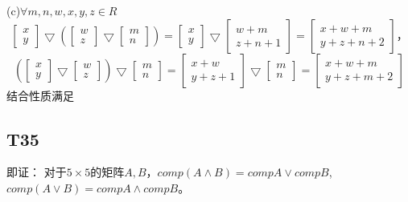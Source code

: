 \documentclass{article}
\begin{document}
(c)$\forall m, n, w, x, y, z \in R$
\[
\begin{bmatrix}
    x\\
    y
\end{bmatrix}
\bigtriangledown
\left(
    \begin{bmatrix}
        w\\
        z
    \end{bmatrix}
    \bigtriangledown
    \begin{bmatrix}
        m\\
        n
    \end{bmatrix}
\right)
=
\begin{bmatrix}
    x\\
    y
\end{bmatrix}
\bigtriangledown
\begin{bmatrix}
    w + m\\
    z + n + 1
\end{bmatrix}
=
\begin{bmatrix}
    x + w + m\\
    y + z + n + 2
\end{bmatrix}，
\]
\[
\left(
    \begin{bmatrix}
        x\\
        y
    \end{bmatrix}
    \bigtriangledown
    \begin{bmatrix}
        w\\
        z
    \end{bmatrix}
\right)
\bigtriangledown
\begin{bmatrix}
    m\\
    n
\end{bmatrix}
=
\begin{bmatrix}
    x + w\\
    y + z + 1
\end{bmatrix}
\bigtriangledown
\begin{bmatrix}
    m\\
    n
\end{bmatrix}
=
\begin{bmatrix}
    x + w + m\\
    y + z + m + 2
\end{bmatrix}
\]
结合性质满足
\subsection{T35}
即证：
对于$5 \times 5$的矩阵$A, B$，$comp(A \land B) = compA \lor compB$, 
$comp(A \lor B) = compA \land compB$。
\end{document}
